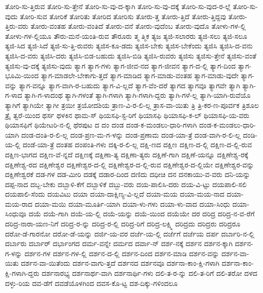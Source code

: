{ತೋರಿ-ಸು-ತ್ತಿರುವ
ತೋರಿ-ಸು-ತ್ತೇನೆ
ತೋರಿ-ಸು-ವು-ದ-ಕ್ಕಾಗಿ
ತೋರಿ-ಸು-ವು-ದಕ್ಕೆ
ತೋರಿ-ಸು-ವುದ-ರ-ಲ್ಲೆ
ತೋರಿ-ಸು-ವುದು
ತೋರಿ-ಸುವ
ತೋರಿಕೆ
ತೋರಿತು
ತೋರಿದ
ತೋರಿಸು
ತೋರು-ತ್ತ
ತೋರು-ತ್ತಿದೆ
ತೋರು-ತ್ತಿದ್ದವು
ತೋರು-ತ್ತಿರು-ವರು
ತೋರು-ವಂತಹ
ತೋರು-ವಂತಿದೆ
ತೋರು-ವನೆ
ತೋರು-ವುದೆಂಬ
ತೋರು-ವುದೊ
ತೋಳು-ಗಳ-ಲ್ಲಿ
ತೋಳು-ಗಳ-ಲ್ಲಿಯೂ
ತೌರು-ಮನೆ-ಯಂತಿ-ರುವ
ತೌರೂರು
ತ್ಮ
ತ್ಮಿಕ
ತ್ಯಜ
ತ್ಯಜಿ-ಸಲಾರರು
ತ್ಯಜಿ-ಸಲು
ತ್ಯಜಿ-ಸಲೂ
ತ್ಯಜಿ-ಸಿದ
ತ್ಯಜಿ-ಸಿದೆ
ತ್ಯಜಿ-ಸು-ತ್ತಿ-ರುವರು
ತ್ಯಜಿಸ-ಕೂ-ಡದು
ತ್ಯಜಿಸ-ಬೇಕು
ತ್ಯಜಿಸ-ಬೇಕೆಂದು
ತ್ಯಜಿಸಿ
ತ್ಯಜಿಸಿ-ದ-ವನು
ತ್ಯಜಿಸಿ-ದ-ವರು
ತ್ಯಜಿಸಿ-ದರು
ತ್ಯಜಿಸಿ-ಬಿಡ-ಬಹುದು
ತ್ಯಜಿಸಿ-ಬಿಡಿ
ತ್ಯಜಿಸಿ-ರುವರು
ತ್ಯಜಿಸು
ತ್ಯಜಿಸು-ತ್ತೇನೆ
ತ್ಯಜಿಸು-ವಂತೆ
ತ್ಯಜಿಸು-ವು-ದಕ್ಕೆ
ತ್ಯಜಿಸು-ವುದು
ತ್ಯಾಗ
ತ್ಯಾಗ-ಗಳು
ತ್ಯಾಗ-ಜೀವ-ನದ
ತ್ಯಾಗ-ಜೀವನ
ತ್ಯಾಗ-ದ-ಲ್ಲಿ
ತ್ಯಾಗ-ದಿಂದ
ತ್ಯಾಗ-ಭೂಮಿ-ಯಿಂದ
ತ್ಯಾಗ-ಮಾಡಲೇ-ಬೇಕಾಗು-ತ್ತದೆ
ತ್ಯಾಗ-ಮಾಡಿದ
ತ್ಯಾಗ-ಮಾಡು-ವಂತಹ
ತ್ಯಾಗ-ಮಾಡು-ವುದೇ
ತ್ಯಾಗ-ವನ್ನು
ತ್ಯಾಗ-ವನ್ನೂ
ತ್ಯಾಗ-ವಾಗಿ-ರ-ಬಹುದು
ತ್ಯಾಗ-ವಿ-ಲ್ಲದೆ
ತ್ಯಾಗ-ವೆಂ-ದರೆ
ತ್ಯಾಗದ
ತ್ಯಾಗವೂ
ತ್ಯಾಗವೇ
ತ್ಯಾಗಿ
ತ್ಯಾಗಿ-ಗ-ಳಾದ
ತ್ಯಾಗಿ-ಗ-ಳಾದಂಥ
ತ್ಯಾಗಿ-ಗಳಂತೆ
ತ್ಯಾಗಿ-ಗಳಾಗಿ
ತ್ಯಾಗಿ-ಗಳಾಗಿ-ದ್ದರು
ತ್ಯಾಗಿ-ಗಳೆ-ಲ್ಲ
ತ್ಯಾಗಿ-ಯಾಗಿ-ರುವೆಯೊ
ತ್ಯಾಗಿಗೆ
ತ್ಯಾಗಿಯೇ
ತ್ಯಾಗೀ
ತ್ರಯೀ
ತ್ರಯೋದಶಿಯ
ತ್ರಾಣ-ವಿ-ರ-ಲಿ-ಲ್ಲ
ತ್ರಾಸ-ವಾ-ಯಿತು
ತ್ರಿ
ತ್ರಿ-ಕರ-ಣ-ಪೂರ್ವಕ
ತ್ರಿಶೂಲ
ತ್ರೈ
ತ್ವರೆ-ಯಿಂದ
ಥರ್ಸ
ಥಳಕಿನ
ಥಾಮ-ಸ್
ಥಿಯಸಫಿ-ಸ್ಟ-ರಿಗೆ
ಥಿಯಾಸಫಿ
ಥಿಯಾಸಫಿ-ಕ-ಲ್
ಥಿಯಾಸಫಿ-ಯ-ವರು
ಥಿಯಾಸಫಿಗೆ
ಥಿಯೇಟರಿ-ನ-ಲ್ಲಿ
ಥೆರಪುಟ
ದ
ದಂ
ದಂಡ
ದಂಡ-ಕ-ಮಂಡಲು-ಧಾರಿ-ಗಳಾಗಿ
ದಂಡ-ಕ-ಮಂಡಲು-ಧಾರಿ-ಯಾಗಿ
ದಂಡ-ದಂತಿ-ರ-ಲಿ-ಲ್ಲ
ದಂಡ-ಪ್ರಣ-ಮ-ಗ-ಳನ್ನು
ದಂಡ-ಪ್ರಣಾಮ
ದಂಡ-ಯಾ-ತ್ರೆ
ದಂಡ-ವಾಗಿ-ರ-ಲಿ-ಲ್ಲ
ದಂಡಿ-ಯ-ಲ್ಲಿ
ದಂಡೆ-ಯಾ-ತ್ರೆ
ದಂತಹ
ದಂಪಂತಿ-ಗಳು
ದಕ್ಕಿ-ರ-ಲಿ-ಲ್ಲ
ದಕ್ಷಿ-ಣದ
ದಕ್ಷಿಣ
ದಕ್ಷಿಣ-ದ-ಲ್ಲಿ
ದಕ್ಷಿಣ-ದ-ಲ್ಲಿ-ರುವ
ದಕ್ಷಿಣ-ಭಾಗದ
ದಕ್ಷಿಣ-ವೆ-ನ್ನದೆ
ದಕ್ಷಿಣಕ್ಕೆ
ದಕ್ಷಿಣಾ-ತ್ಯ
ದಕ್ಷಿಣಾ-ತ್ಯರು
ದಕ್ಷಿಣೆ-ಗಾಗಿ
ದಕ್ಷಿಣೆ-ಯನ್ನೂ
ದಕ್ಷಿಣೇಶ್ವ-ರಕ್ಕೆ
ದಕ್ಷಿಣೇಶ್ವ-ರದ
ದಕ್ಷಿಣೇಶ್ವರ
ದಕ್ಷಿಣೇಶ್ವರ-ದ-ಲ್ಲಿ
ದಕ್ಷಿಣೇಶ್ವರ-ದ-ಲ್ಲಿ-ರುವ
ದಕ್ಷಿಣೇಶ್ವರ-ದ-ಲ್ಲಿಯೇ
ದಕ್ಷಿಣೇಶ್ವರ-ವನ್ನು
ದಕ್ಷಿಣೇಶ್ವರಕೆ
ದಡ-ಗಳ
ದಡ-ಮೀರಿ
ದಡಕ್ಕೆ
ದಡಾರ-ದಿಂದ
ದಣಿದು
ದಧೀಚಿ
ದನ
ದನಕಾಯು-ವ-ವರು
ದನಿ-ಯನ್ನು
ದಪ್ಪ-ನಾದ
ದಬ್ಬ-ಬೇಕು
ದಬ್ಬಾಳಿ-ಕೆಗೆ
ದಬ್ಬಾಳಿಕೆ
ದಬ್ಬು-ವರು
ದಯ-ಪಾಲಿಸಿ-ದರು
ದಯ-ವಿ-ಟ್ಟು
ದಯಪಾಲಿ-ಸಲಿ
ದಯಪಾಲಿ-ಸೆಂದು
ದಯವಿಟು
ದಯಾ
ದಯಾ-ದಾಕ್ಷಿಣ್ಯ-ವಿ-ಲ್ಲದೆ
ದಯಾ-ಮಯ
ದಯಾ-ಮಯ-ನಾದ
ದಯಾ-ಮಯ-ರಾದ
ದಯಾ-ಮಯಿ
ದಯಾ-ಮೂರ್ತಿ-ಯಾಗಿ
ದಯಾ-ಳು-ಗಳು
ದಯಾ-ಳು-ವಾದ
ದಯಾ-ಸಿಂಧು
ದಯಾ-ಸಿಂಧುವೂ
ದಯೆ
ದಯೆ-ಗಾಗಿ
ದಯೆ-ಯ-ಲ್ಲಿ
ದಯೆ-ಯನ್ನು
ದಯೆ-ಯಿಂದ
ದಯೆಯೇ
ದರ
ದರಿದ್ರ
ದರಿದ್ರ-ನ-ವ-ರೆಗೆ
ದರಿದ್ರ-ನಾರಾ-ಯಣ-ನಿಗೆ
ದರಿದ್ರ-ರ-ನ್ನು
ದರಿದ್ರ-ರ-ಲ್ಲಿ
ದರಿದ್ರ-ರಿಗೆ
ದರಿದ್ರ-ಲಕ್ಷ್ಮಿ
ದರಿದ್ರದು
ದರಿದ್ರರು
ದರಿದ್ರರೂ
ದರೋ-ಡೆ-ಗಾರನೋ
ದರೋ-ಡೆ-ಯನ್ನು
ದರ್ಜಿ-ಯ-ವರ
ದರ್ಜೆ-ಯ-ಲ್ಲಿ
ದರ್ಜೆಗೆ
ದರ್ಜೆಯ
ದರ್ಪ
ದರ್ಬಾರಿ-ನ-ಲ್ಲಿ
ದರ್ಬಾರು
ದರ್ಬಾರ್
ದರ್ಭಾಂಗದ
ದರ್ಮ-ವನ್ನೇ
ದರ್ಮದ
ದರ್ವಾ-ನ್
ದರ್ಶ-ನಕ್ಕೆ
ದರ್ಶನ
ದರ್ಶನ-ಕ್ಕಾಗಿ
ದರ್ಶನ-ಗ-ಳನ್ನು
ದರ್ಶನ-ಗಳ
ದರ್ಶನ-ಗಳ-ಲ್ಲಿ
ದರ್ಶನ-ದ-ಲ್ಲಿ
ದರ್ಶನ-ದಿಂದ
ದರ್ಶನ-ಮಾಡಿ
ದರ್ಶನ-ವನ್ನು
ದರ್ಶನ-ವಾ-ಯಿತು
ದರ್ಶನ-ವಾ-ಯಿತೆಂದು
ದರ್ಶನ-ವಾಗು-ತ್ತದೆ
ದರ್ಶನದ
ದರ್ಶನವೂ
ದರ್ಶನಾ-ಕಾಂ-ಕ್ಷಿ-ಗಳಾಗಿ
ದರ್ಶನಾ-ಕಾಂ-ಕ್ಷಿ-ಗಳಾಗಿ-ದ್ದರು
ದರ್ಶನಾರಭ್ಯ
ದರ್ಶನಾರ್ಥ-ವಾಗಿ
ದರ್ಶನಾರ್ಥಿ-ಗಳು
ದಲಿ-ತ-ರ-ನ್ನು
ದಲಿ-ತ-ರಿಗೆ
ದಲಿ-ತರೋ
ದಳದ
ದಳ್ಳು-ರಿಯ
ದವ-ಡೆಗೆ
ದವಡೆಯೊಳಗಿಂದ
ದವಸ-ಕೊ-ಟ್ಟ
ದಶ-ದಿಕ್ಕು-ಗಳಿಂದಲೂ
}
